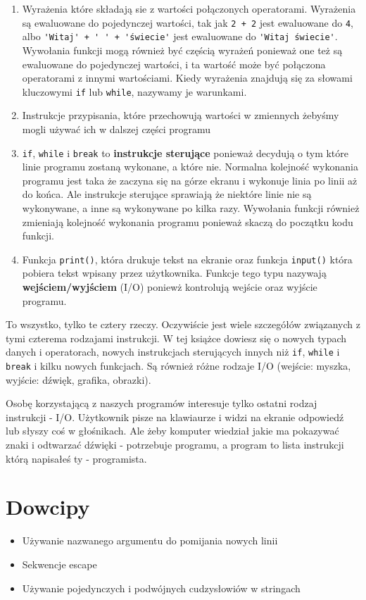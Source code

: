 \documentclass{book}
\newcommand{\btopicscovered}{
	\begin{graybox}
	\begin{itemize}
}
\newcommand{\etopicscovered}{
	\end{itemize}
	\end{graybox}
}
\begin{document}
\begin{enumerate}
\item Wyrażenia które składają sie z wartości połączonych operatorami. Wyrażenia są ewaluowane do pojedynczej wartości, tak jak \lstinline{2 + 2} jest ewaluowane do \lstinline{4}, albo \lstinline{'Witaj' + ' ' + 'świecie'} jest ewaluowane do \lstinline{'Witaj świecie'}. Wywołania funkcji mogą również być częścią wyrażeń ponieważ one też są ewaluowane do pojedynczej wartości, i ta wartość może być połączona operatorami z innymi wartościami. Kiedy wyrażenia znajdują się za słowami kluczowymi \lstinline{if} lub \lstinline{while}, nazywamy je warunkami.
\item Instrukcje przypisania, które przechowują wartości w zmiennych żebyśmy mogli używać ich w dalszej części programu
\item \lstinline{if}, \lstinline{while} i \lstinline{break} to {\bf instrukcje sterujące} ponieważ decydują o tym które linie programu zostaną wykonane, a które nie. Normalna kolejność wykonania programu jest taka że zaczyna się na górze ekranu i wykonuje linia po linii aż do końca. Ale instrukcje sterujące sprawiają że niektóre linie nie są wykonywane, a inne są wykonywane po kilka razy. Wywołania funkcji również zmieniają kolejność wykonania programu ponieważ skaczą do początku kodu funkcji.
\item Funkcja \lstinline{print()}, która drukuje tekst na ekranie oraz funkcja \lstinline{input()} która pobiera tekst wpisany przez użytkownika. Funkcje tego typu nazywają {\bf wejściem/wyjściem} (I/O) poniewż kontrolują wejście oraz wyjście programu.
\end{enumerate}

To wszystko, tylko te cztery rzeczy. Oczywiście jest wiele szczegółów związanych z tymi czterema rodzajami instrukcji. W tej książce dowiesz się o nowych typach danych i operatorach, nowych instrukcjach sterujących innych niż \lstinline{if}, \lstinline{while} i \lstinline{break} i kilku nowych funkcjach. Są również różne rodzaje I/O (wejście: myszka, wyjście: dźwięk, grafika, obrazki).

Osobę korzystającą z naszych programów interesuje tylko ostatni rodzaj instrukcji - I/O. Użytkownik pisze na klawiaurze i widzi na ekranie odpowiedź lub słyszy coś w głośnikach. Ale żeby komputer wiedział jakie ma pokazywać znaki i odtwarzać dźwięki - potrzebuje programu, a program to lista instrukcji którą napisałeś ty - programista.

\chapter{Dowcipy}
\btopicscovered
	\item Używanie nazwanego argumentu do pomijania nowych linii
	\item Sekwencje escape
	\item Używanie pojedynczych i podwójnych cudzysłowiów w stringach
\etopicscovered
\end{document}
